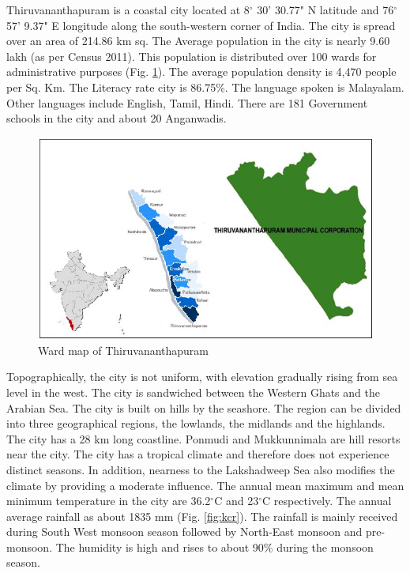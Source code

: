 \documentclass[12pt,a4paper]{report}
\begin{document}
Thiruvananthapuram is a coastal city located at 8$^\circ$ 30' 30.77" N latitude and 76$^\circ$ 57' 9.37" E longitude along the south-western corner of India. The city is spread over an area of 214.86 km sq. The Average population in the city is nearly 9.60 lakh (as per Census 2011). This population is distributed over 100 wards for administrative purposes (Fig. \ref{fig:wardmapoftvm}). The average population density is 4,470 people per Sq. Km. The Literacy rate city is 86.75\%. The language spoken is Malayalam. Other languages include English, Tamil, Hindi. There are 181 Government schools in the city and about 20 Anganwadis.

\begin{figure}[H]
	\centering
	\includegraphics[width=0.85\linewidth]{ward_map_of_tvm}
	\caption{Ward map of Thiruvananthapuram}
	\label{fig:wardmapoftvm}
\end{figure}

Topographically, the city is not uniform, with elevation gradually rising from sea level in the west. The city is sandwiched between the Western Ghats and the Arabian Sea. The city is built on hills by the seashore. The region can be divided into three geographical regions, the lowlands, the midlands and the highlands. The city has a 28 km long coastline. Ponmudi and Mukkunnimala are hill resorts near the city.
The city has a tropical climate and therefore does not experience distinct seasons. In addition, nearness to the Lakshadweep Sea also modifies the climate by providing a moderate influence. The annual mean maximum and mean minimum temperature in the city are 36.2$^\circ$C and 23$^\circ$C respectively. The annual average rainfall as about 1835 mm (Fig. \ref{fig:kcr}). The rainfall is mainly received during South West monsoon season followed by North-East monsoon and pre-monsoon. The humidity is high and rises to about 90\% during the monsoon season.
\end{document}
